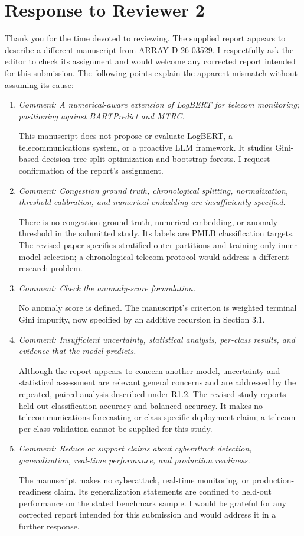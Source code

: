 \documentclass[11pt]{article}
\newcommand{\comment}[1]{\textit{Comment: #1}}
\begin{document}
\section*{Response to Reviewer 2}
Thank you for the time devoted to reviewing. The supplied report appears to describe a different manuscript from ARRAY-D-26-03529. I respectfully ask the editor to check its assignment and would welcome any corrected report intended for this submission. The following points explain the apparent mismatch without assuming its cause:
\begin{enumerate}[label=R2.\arabic*.]
\item \comment{A numerical-aware extension of LogBERT for telecom monitoring; positioning against BARTPredict and MTRC.}

This manuscript does not propose or evaluate LogBERT, a telecommunications system, or a proactive LLM framework. It studies Gini-based decision-tree split optimization and bootstrap forests. I request confirmation of the report's assignment.

\item \comment{Congestion ground truth, chronological splitting, normalization, threshold calibration, and numerical embedding are insufficiently specified.}

There is no congestion ground truth, numerical embedding, or anomaly threshold in the submitted study. Its labels are PMLB classification targets. The revised paper specifies stratified outer partitions and training-only inner model selection; a chronological telecom protocol would address a different research problem.

\item \comment{Check the anomaly-score formulation.}

No anomaly score is defined. The manuscript's criterion is weighted terminal Gini impurity, now specified by an additive recursion in Section 3.1.

\item \comment{Insufficient uncertainty, statistical analysis, per-class results, and evidence that the model predicts.}

Although the report appears to concern another model, uncertainty and statistical assessment are relevant general concerns and are addressed by the repeated, paired analysis described under R1.2. The revised study reports held-out classification accuracy and balanced accuracy. It makes no telecommunications forecasting or class-specific deployment claim; a telecom per-class validation cannot be supplied for this study.

\item \comment{Reduce or support claims about cyberattack detection, generalization, real-time performance, and production readiness.}

The manuscript makes no cyberattack, real-time monitoring, or production-readiness claim. Its generalization statements are confined to held-out performance on the stated benchmark sample. I would be grateful for any corrected report intended for this submission and would address it in a further response.
\end{enumerate}
\end{document}
